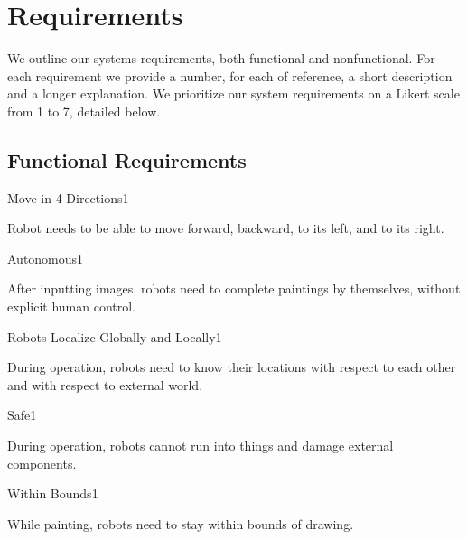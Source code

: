 
\section{Requirements}
\label{sec:requirements}
We outline our systems requirements, both functional and nonfunctional. For each requirement we provide a number, for each of reference, a short description and a longer explanation. We prioritize our system requirements on a Likert scale from 1 to 7, detailed below. 


\subsection{Functional Requirements}
\label{sec:functional_requirements}

\begin{functional_requirement}{Move in 4 Directions}{1}
\item Robot needs to be able to move forward, backward, to its left, and to its right. 
\end{functional_requirement}

\begin{functional_requirement}{Autonomous}{1}
\item After inputting images, robots need to complete paintings by themselves, without explicit human control. 
\end{functional_requirement}

\begin{functional_requirement}{Robots Localize Globally and Locally}{1}
\item During operation, robots need to know their locations with respect to each other and with respect to external world. 
\end{functional_requirement}

\begin{functional_requirement}{Safe}{1}
\item During operation, robots cannot run into things and damage external components.
\end{functional_requirement}

\begin{functional_requirement}{Within Bounds}{1}
\item While painting, robots need to stay within bounds of drawing.
\end{functional_requirement}

